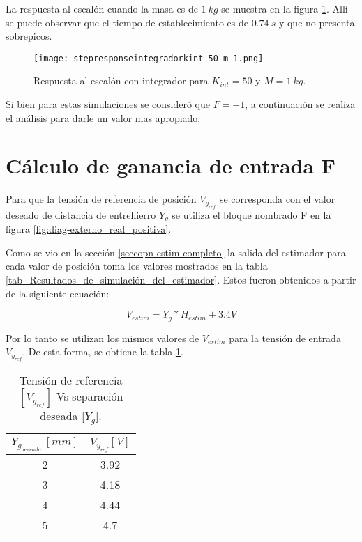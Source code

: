 \noindent La respuesta al escal\'{o}n cuando la masa es de $1 \:kg$ se muestra en la figura \ref{fig:respuesta-al-escalon-con-k-50-M-1}. All\'{i} se puede observar que el tiempo de establecimiento es de $0.74\:s$ y que no presenta sobrepicos.

\begin{figure}[H]
	\centering
	\texttt{[image: stepresponseintegradorkint\_50\_m\_1.png]}
	\caption{Respuesta al escalón con integrador para $K_{int} =50$ y $M = 1 \:kg$.}
	\label{fig:respuesta-al-escalon-con-k-50-M-1}
\end{figure}

Si bien para estas simulaciones se consideró que $F=-1$, a continuación se realiza el análisis para darle un valor mas apropiado.

\section{Cálculo de ganancia de entrada F}

Para que la tensión de referencia de posición $V_{y_{ref}}$ se corresponda con el valor deseado de distancia de entrehierro $Y_g$ se utiliza el bloque nombrado F en la figura \ref{fig:diag-externo_real_positiva}. 

Como se vio en la sección \ref{seccopn-estim-completo} la salida del estimador para cada valor de posición toma los  valores mostrados en la tabla \ref{tab_Resultados_de_simulación_del_estimador}. Estos fueron obtenidos a partir de la siguiente ecuación:

\begin{equation}
	V_{estim}=Y_g*H_{estim}+3.4V
\end{equation}


Por lo tanto se utilizan los mismos valores de $V_{estim}$ para la tensión de entrada $V_{y_{ref}}$. De esta forma, se obtiene la tabla \ref{tension-ref-vs-separacion-deseada}.

\begin{table}[H]
	\begin{center}
		\begin{tabular}{| c | c |}
			\hline
			$Y_{g_{deseado}}\:[mm]$ & $V_{y_{ref}}[V]$\\ \hline
			2 &	3.92 \\ \hline
			3 & 4.18\\ \hline
			4 & 4.44 \\ \hline
			5 & 4.7\\ \hline
		\end{tabular}
		\caption{Tensión de referencia $[V_{y_{ref}}]$ Vs separación deseada [$Y_g$].}
		\label{tension-ref-vs-separacion-deseada}
	\end{center}
\end{table}

